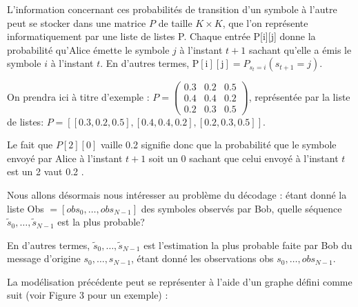 \documentclass[10pt]{article}
\begin{document}
L'information concernant ces probabilités de transition d'un symbole à l'autre peut se stocker dans une matrice $P$ de taille $K \times K$, que l'on représente informatiquement par une liste de listes P. Chaque entrée P[i][j] donne la probabilité qu'Alice émette le symbole $j$ à l'instant $t+1$ sachant qu'elle a émis le symbole $i$ à l'instant $t$. En d'autres termes, $\mathrm{P}[\mathrm{i}][\mathrm{j}]=P_{s_{t}=i}\left(s_{t+1}=j\right)$.

On prendra ici à titre d'exemple : $P=\left(\begin{array}{ccc}0.3 & 0.2 & 0.5 \\ 0.4 & 0.4 & 0.2 \\ 0.2 & 0.3 & 0.5\end{array}\right)$, représentée par la liste de listes: $P=[[0.3,0.2,0.5],[0.4,0.4,0.2],[0.2,0.3,0.5]]$.

Le fait que $P[2][0]$ vaille 0.2 signifie donc que la probabilité que le symbole envoyé par Alice à l'instant $t+1$ soit un 0 sachant que celui envoyé à l'instant $t$ est un 2 vaut 0.2 .

Nous allons désormais nous intéresser au problème du décodage : étant donné la liste Obs $=\left[o b s_{0}, \ldots, o b s_{N-1}\right]$ des symboles observés par Bob, quelle séquence $\tilde{s}_{0}, \ldots, \tilde{s}_{N-1}$ est la plus probable?

En d'autres termes, $\tilde{s}_{0}, \ldots, \tilde{s}_{N-1}$ est l'estimation la plus probable faite par Bob du message d'origine $s_{0}, \ldots, s_{N-1}$, étant donné les observations obs $s_{0}, \ldots, o b s_{N-1}$.

La modélisation précédente peut se représenter à l'aide d'un graphe défini comme suit (voir Figure 3 pour un exemple) :
\end{document}
